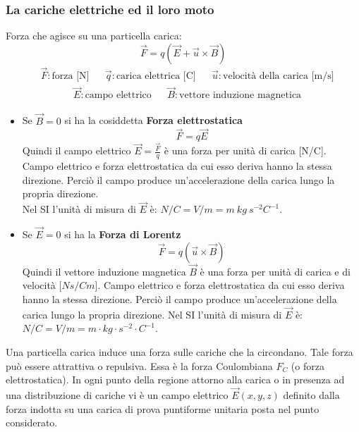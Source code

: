 \documentclass{article}
\begin{document}
\subsubsection{La cariche elettriche ed il loro moto}
Forza che agisce su una particella carica:
\[
    \vec F = q(\vec E + \vec u \times \vec B)
\]
\begin{align*}
    &\vec F: \text{forza [N]} &
    &\vec q: \text{carica elettrica [C]} &
    &\vec u: \text{velocità della carica [m/s]}
\end{align*}
\begin{align*}
    &\vec E: \text{campo elettrico} &
    &\vec B: \text{vettore induzione magnetica}
\end{align*}
\begin{itemize}
    \item Se $\vec B=0$ si ha la cosiddetta \textbf{Forza elettrostatica}
    \[
        \vec F = q \vec E
    \]
    Quindi il campo elettrico $\vec E = \frac{\vec F}{q} $ è una forza per unità di carica [N/C].
    \vspace*{0.1cm}\\
    Campo elettrico e forza elettrostatica da cui esso deriva hanno la stessa
    direzione. Perciò il campo produce un'accelerazione della carica lungo la
    propria direzione.
    \vspace*{0.1cm}\\
    Nel SI l'unità di misura di $\vec E$ è: $N/C = V/ m = m \ kg \ s^{-2} C^{-1}$.
    \vspace*{0.2cm}\\
    \item Se $\vec E=0$ si ha la \textbf{Forza di Lorentz}
    \[
        \vec F = q(\vec u \times \vec B)
    \]
    Quindi il vettore induzione magnetica $\vec B$ è una forza per unità di carica e di velocità [$N s / C m$].
    Campo elettrico e forza elettrostatica da cui esso deriva hanno la stessa
    direzione. Perciò il campo produce un'accelerazione della carica lungo la
    propria direzione.
    Nel SI l'unità di misura di $\vec E$ è: $N/C = V/ m = m \cdot kg \cdot s^{-2} \cdot C^{-1}$.
\end{itemize}
Una particella carica induce una forza sulle cariche
che la circondano. Tale forza può essere attrattiva o
repulsiva. Essa è la forza Coulombiana $F_C$ (o forza
elettrostatica). In ogni punto della regione attorno
alla carica o in presenza ad una distribuzione di
cariche vi è un campo elettrico $\vec E(x,y,z)$ definito dalla
forza indotta su una carica di prova puntiforme
unitaria posta nel punto considerato.
\end{document}
